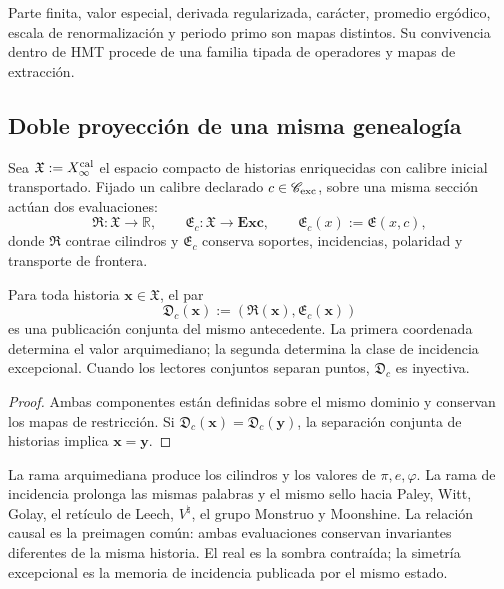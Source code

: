 Parte finita, valor especial, derivada regularizada, carácter, promedio
ergódico, escala de renormalización y periodo primo son mapas distintos. Su
convivencia dentro de HMT procede de una familia tipada de operadores y
mapas de extracción.

\subsection{Doble proyección de una misma genealogía}

Sea \(\mathfrak X:=X_\infty^{\rm cal}\) el espacio compacto de historias
enriquecidas con calibre inicial transportado. Fijado un calibre declarado
\(c\in\mathscr C_{\rm exc}\), sobre una misma sección actúan dos
evaluaciones:
\[
 \mathfrak R:\mathfrak X\longrightarrow\mathbb R,
 \qquad
 \mathfrak E_c:\mathfrak X\longrightarrow\mathbf{Exc},
 \qquad
 \mathfrak E_c(x):=\mathfrak E(x,c),
\]
donde \(\mathfrak R\) contrae cilindros y \(\mathfrak E_c\) conserva soportes,
incidencias, polaridad y transporte de frontera.

\begin{theorem}
\label{p3-83-c44-s2:thm:unidad-causal-doble-proyeccion-numero}
Para toda historia \(\boldsymbol x\in\mathfrak X\), el par
\[
 \mathfrak D_c(\boldsymbol x)
 :=(\mathfrak R(\boldsymbol x),\mathfrak E_c(\boldsymbol x))
\]
es una publicación conjunta del mismo antecedente. La primera coordenada
determina el valor arquimediano; la segunda determina la clase de incidencia
excepcional. Cuando los lectores conjuntos separan puntos,
\(\mathfrak D_c\) es inyectiva.
\end{theorem}

\begin{proof}
Ambas componentes están definidas sobre el mismo dominio y conservan los
mapas de restricción. Si
\(\mathfrak D_c(\boldsymbol x)=\mathfrak D_c(\boldsymbol y)\), la separación
conjunta de historias implica \(\boldsymbol x=\boldsymbol y\).
\end{proof}

La rama arquimediana produce los cilindros y los valores de
\(\pi,e,\varphi\). La rama de incidencia prolonga las mismas palabras y el
mismo sello hacia Paley, Witt, Golay, el retículo de Leech,
\(V^\natural\), el grupo Monstruo y Moonshine. La relación causal es la
preimagen común: ambas evaluaciones conservan invariantes diferentes de la
misma historia. El real es la sombra contraída; la simetría excepcional es la
memoria de incidencia publicada por el mismo estado.

